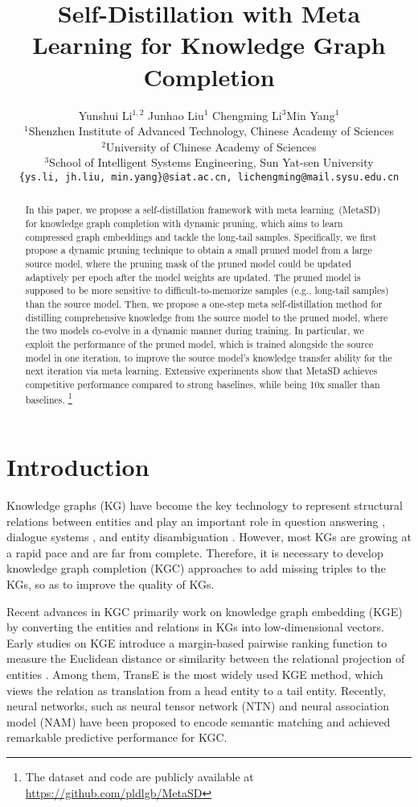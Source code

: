 \documentclass[11pt]{article}
\title{Self-Distillation with Meta Learning for Knowledge Graph Completion}
\author{Yunshui Li$^{1,2}$ \quad  Junhao Liu$^{1}$  \quad Chengming Li$^{3}$\footnotemark[1] \quad Min Yang$^{1}$\footnotemark[1] \\
        $^{1}$Shenzhen Institute of Advanced Technology, Chinese Academy of Sciences \\
        $^{2}$University of Chinese Academy of Sciences \\
        $^{3}$School of Intelligent Systems Engineering, Sun Yat-sen University\\
        \texttt{\{ys.li, jh.liu, min.yang\}@siat.ac.cn, lichengming@mail.sysu.edu.cn}
        }
\renewcommand{\thefootnote}{\fnsymbol{footnote}}
\begin{document}
\maketitle
\renewcommand{\thefootnote}{\fnsymbol{footnote}}
\renewcommand{\thefootnote}{\arabic{footnote}}

\begin{abstract}
In this paper, we propose a self-distillation framework with meta learning~(MetaSD) for knowledge graph completion with dynamic pruning, which aims to learn compressed graph embeddings and tackle the long-tail samples. Specifically, we first propose a dynamic pruning technique to obtain a small pruned model from a large source model, where the pruning mask of the pruned model could be updated adaptively per epoch after the model weights are updated. The pruned model is supposed to be more sensitive to difficult-to-memorize samples (e.g., long-tail samples) than the source model. 
Then, we propose a one-step meta self-distillation method for distilling comprehensive knowledge from the source model to the pruned model, where the two models co-evolve in a dynamic manner during training.
In particular, we exploit the performance of the pruned model, which is trained alongside the source model in one iteration, to improve the source model's knowledge transfer ability for the next iteration via meta learning.
Extensive experiments show that MetaSD achieves competitive performance compared to strong baselines, while being 10x smaller than baselines. \footnote{The dataset and code are publicly available at \url{https://github.com/pldlgb/MetaSD}}
\end{abstract}

\section{Introduction}
Knowledge graphs (KG) have become the key technology to represent structural relations between entities and play an important role in question answering \cite{shen2018knowledge}, dialogue systems \cite{yan2017building}, and entity disambiguation \cite{mulang2020evaluating,si2022scl,si2023santa}.
However, most KGs are growing at a rapid pace and are far from complete. Therefore, it is necessary to develop knowledge graph completion (KGC) approaches to add missing triples to the KGs, so as to improve the quality of KGs. 

Recent advances in KGC primarily work on knowledge graph embedding (KGE) by converting the entities and relations in KGs into low-dimensional vectors. Early studies on KGE introduce a margin-based pairwise ranking function to measure the Euclidean distance or similarity between the relational projection of entities \cite{nickel2011three,bordes2013translating,yang2014embedding,trouillon2016complex}. Among them, TransE \cite{bordes2013translating} is the most widely used KGE method, which views the relation as translation from a head entity to a tail entity. 
Recently, neural networks, such as neural tensor network (NTN) \cite{socher2013reasoning} and neural association model (NAM) \cite{liu2016probabilistic} have been proposed to encode semantic matching and achieved remarkable predictive performance for KGC. 
\end{document}
